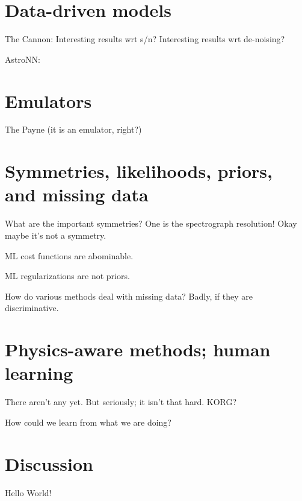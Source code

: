 \documentclass[modern]{aastex631}
\begin{document}
\section{Data-driven models}

The Cannon: Interesting results wrt s/n? Interesting results wrt de-noising?

AstroNN: 

\section{Emulators}

The Payne (it is an emulator, right?)

\section{Symmetries, likelihoods, priors, and missing data}

What are the important symmetries? One is the spectrograph resolution! Okay maybe it's not a symmetry.

ML cost functions are abominable.

ML regularizations are not priors.

How do various methods deal with missing data? Badly, if they are discriminative.

\section{Physics-aware methods; human learning}

There aren't any yet. But seriously; it isn't that hard. KORG?

How could we learn from what we are doing?

\section{Discussion}

Hello World!

{}

\end{document}
